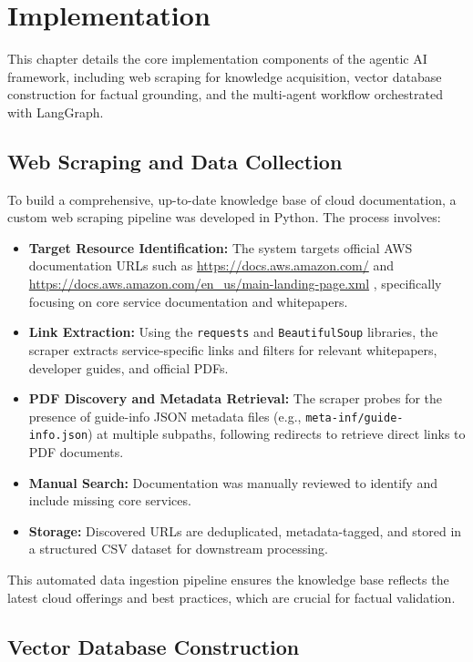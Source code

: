 \chapter{Implementation}

This chapter details the core implementation components of the agentic AI framework, including web scraping for knowledge acquisition, vector database construction for factual grounding, and the multi-agent workflow orchestrated with LangGraph.

\section{Web Scraping and Data Collection}

To build a comprehensive, up-to-date knowledge base of cloud documentation, a custom web scraping pipeline was developed in Python. The process involves:

\begin{itemize}
\item \textbf{Target Resource Identification:} The system targets official AWS documentation URLs such as \url{https://docs.aws.amazon.com/}
 and \url{https://docs.aws.amazon.com/en_us/main-landing-page.xml}
, specifically focusing on core service documentation and whitepapers.
\item \textbf{Link Extraction:} Using the \texttt{requests} and \texttt{BeautifulSoup} libraries, the scraper extracts service-specific links and filters for relevant whitepapers, developer guides, and official PDFs.
\item \textbf{PDF Discovery and Metadata Retrieval:} The scraper probes for the presence of guide-info JSON metadata files (e.g., \texttt{meta-inf/guide-info.json}) at multiple subpaths, following redirects to retrieve direct links to PDF documents.
\item \textbf{Manual Search:} Documentation was manually reviewed to identify and include missing core services.
\item \textbf{Storage:} Discovered URLs are deduplicated, metadata-tagged, and stored in a structured CSV dataset for downstream processing.
\end{itemize}

This automated data ingestion pipeline ensures the knowledge base reflects the latest cloud offerings and best practices, which are crucial for factual validation.

\section{Vector Database Construction}

